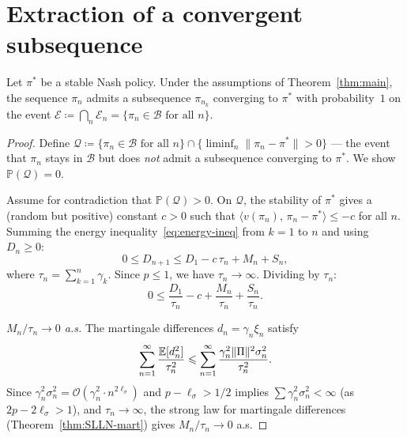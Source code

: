 \documentclass[a4paper,oneside,11pt]{report}
\newcommand{\Prob}{\mathbb{P}}
\newcommand{\calB}{\mathcal{B}}
\newcommand{\calE}{\mathcal{E}}
\newcommand{\calQ}{\mathcal{Q}}
\newcommand{\ip}[2]{\langle #1,\, #2 \rangle}
\newcommand{\norm}[1]{\| #1 \|}
\numberwithin{theorem}{chapter}
\numberwithin{equation}{chapter}
\begin{document}
\section{Extraction of a convergent subsequence}
\label{sec:conv-subseq}

\begin{proposition}
  \label{prop:conv-subseq}
  Let $\pi^*$ be a stable Nash policy. Under the assumptions of
  Theorem~\ref{thm:main}, the sequence $\pi_n$ admits a subsequence
  $\pi_{n_k}$ converging to $\pi^*$ with probability~$1$ on the event
  $\calE \coloneqq \bigcap_n \calE_n = \{\pi_n \in \calB
  \text{ for all } n\}$.
\end{proposition}

\begin{proof}
  Define $\calQ \coloneqq \{\pi_n \in \calB \text{ for all } n\}
  \cap \{\liminf_n \norm{\pi_n - \pi^*} > 0\}$ --- the event that
  $\pi_n$ stays in $\calB$ but does \emph{not} admit a subsequence
  converging to $\pi^*$. We show $\Prob(\calQ) = 0$.

  Assume for contradiction that $\Prob(\calQ) > 0$. On $\calQ$, the
  stability of $\pi^*$ gives a (random but positive) constant $c > 0$
  such that
  $\ip{v(\pi_n)}{\pi_n - \pi^*} \le -c$ for all $n$. Summing the
  energy inequality~\eqref{eq:energy-ineq} from $k = 1$ to $n$ and
  using $D_n \ge 0$:
  \begin{equation}
    0 \le D_{n+1} \le D_1 - c\,\tau_n + M_n + S_n,
    \label{eq:D-contra-bound}
  \end{equation}
  where $\tau_n = \sum_{k=1}^n \gamma_k$. Since $p \le 1$, we have
  $\tau_n \to \infty$. Dividing by $\tau_n$:
  \begin{equation}
    0 \le \frac{D_1}{\tau_n} - c + \frac{M_n}{\tau_n}
    + \frac{S_n}{\tau_n}.
    \label{eq:contra-divided}
  \end{equation}

  \emph{$M_n/\tau_n \to 0$ a.s.}\; The martingale differences
  $d_n = \gamma_n \xi_n$ satisfy
  \begin{equation}
    \sum_{n=1}^\infty \frac{\E[d_n^2]}{\tau_n^2}
    \le \sum_{n=1}^\infty \frac{\gamma_n^2 \norm{\Pi}^2 \sigma_n^2}
    {\tau_n^2}.
    \label{eq:SLLN-check}
  \end{equation}
  Since $\gamma_n^2 \sigma_n^2 = \mathcal{O}(\gamma_n^2 \cdot n^{2\ell_\sigma})$
  and $p - \ell_\sigma > 1/2$ implies
  $\sum \gamma_n^2 \sigma_n^2 < \infty$ (as $2p - 2\ell_\sigma > 1$),
  and $\tau_n \to \infty$, the strong law for martingale differences
  (Theorem~\ref{thm:SLLN-mart}) gives $M_n/\tau_n \to 0$ a.s.


\end{proof}
\end{document}
